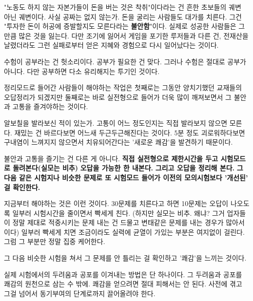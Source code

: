 "노동도 하지 않는 자본가들이 돈을 버는 것은 착취"이다라는 건 흔한 초보들의 궤변 아닌 궤변이다.
사실 공짜는 없지 않는가.
돈을 굴리는 사람들도 대가를 치른다. 그건 "투자한 돈이 허공에 증발할지도 모른다라는 \textbf{불안함}"이다.
실제로 성공한 사람들은 그만큼 많은 것을 잃는다. 다만 조기에 잃어서 게임을 포기한 루저들과 다른 건,
전재산을 날렸더라도 그런 실패로부터 얻은 지혜와 경험으로 다시 일어났다는 것이다.
\vspace{5mm}

수험이 공부라는 건 헛소리이다. 공부가 필요한 건 맞다. 그러나 수험은 절대로 공부가 아니다.
다만 공부하면 다소 유리해지는 투기인 것이다.
\vspace{5mm}

정리모드로 들어간 사람들이 해야하는 작업은
첫째로는 그동안 양치기했던 교재들의 오답정리가 되겠지만
둘째로는 바로 실전형으로 들어가 더욱 많이 깨져보면서 그 불안과 고통을 즐겨야하는 것이다.
\vspace{5mm}

알보칠을 발라보신 적이 있는가.
고통이 어느 정도인지는 직접 발라보지 않으면 모른다.
재밌는 건 바르다보면 어느새 두근두근해진다는 것이다.
5분 정도 괴로워하다보면 구내염이 느껴지지 않으면서 치유되어간다는 '새로운 쾌감'을 발견하기 때문이다.
\vspace{5mm}

불안과 고통을 즐기는 건 다른 게 아니다.
\textbf{직접 실전형으로 제한시간을 두고 시험모드로 돌려본다(실모는 비추)}
\textbf{오답을 가능한 한 내본다.}
\textbf{그리고 오답을 정리해 본다.}
\textbf{그 다음 같은 시험지나 비슷한 문제로 또 시험모드 들어가 이전의 모의시험보다 '개선된' 걸 확인한다.}
\vspace{5mm}

지금부터 해야하는 것은 이런 것이다.
30문제를 치른다고 하면 10문제는 오답이 나오도록 일부러 시험시간을 줄이면서 빡세게 친다.
(하지만 실모는 비추. 왜냐? 그거 업자들이 정말 제대로 적중시키는 문제 내는 건 드물고 변태같은 문제를 내는 경우가 많아서이다)
일부러 빡세게 치면 조금이라도 실력에 균열이 가있는 부분은 여지없이 걸린다.
그럼 그 부분만 정말 집중 케어한다.
\vspace{5mm}

그 다음 비슷한 시험을 쳐서 그 문제를 안 틀리는 걸 확인하고 '쾌감'을 느끼는 것이다.
\vspace{5mm}

실제 시험에서의 두려움과 공포를 이겨내는 방법은 단 하나이다. 그 두려움과 공포를 쾌감의 원천으로 삼는 수 밖에.
쾌감을 얻으려면 절대 피해서는 안 된다. 사전에 겪고 그걸 넘어서 동기부여의 단계로까지 끌어올려야 한다.
\vspace{5mm}

